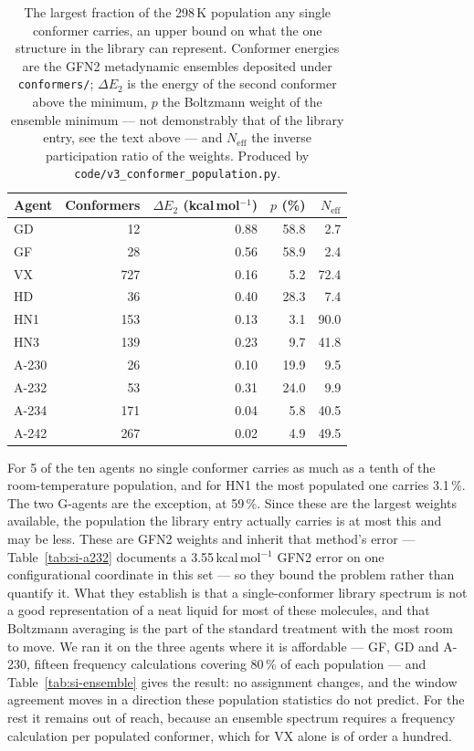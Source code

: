 \documentclass[11pt]{article}
\begin{document}
\begin{table}[htbp]
\centering
\caption{The largest fraction of the 298\,K population any single conformer carries, an
upper bound on what the one structure in the library can represent. Conformer energies are
the GFN2 metadynamic ensembles deposited under \texttt{conformers/}; $\Delta E_2$ is the
energy of the second conformer above the minimum, $p$ the Boltzmann weight of the ensemble
minimum --- not demonstrably that of the library entry, see the text above --- and
$N_\mathrm{eff}$ the inverse participation ratio of the weights. Produced by
\texttt{code/v3\_conformer\_population.py}.}
\label{tab:si-confpop}
\small
\begin{tabular}{lrrrr}
\toprule
Agent & Conformers & $\Delta E_2$ (kcal\,mol$^{-1}$) & $p$ (\%) & $N_\mathrm{eff}$ \\
\midrule
GD & 12 & 0.88 & 58.8 & 2.7 \\
GF & 28 & 0.56 & 58.9 & 2.4 \\
VX & 727 & 0.16 & 5.2 & 72.4 \\
HD & 36 & 0.40 & 28.3 & 7.4 \\
HN1 & 153 & 0.13 & 3.1 & 90.0 \\
HN3 & 139 & 0.23 & 9.7 & 41.8 \\
A-230 & 26 & 0.10 & 19.9 & 9.5 \\
A-232 & 53 & 0.31 & 24.0 & 9.9 \\
A-234 & 171 & 0.04 & 5.8 & 40.5 \\
A-242 & 267 & 0.02 & 4.9 & 49.5 \\
\bottomrule
\end{tabular}

\begin{flushleft}\footnotesize For 5 of the ten agents no single conformer carries as much
as a tenth of the room-temperature population, and for HN1 the most populated one carries
3.1\,\%. The two G-agents are the exception, at 59\,\%. Since these are the largest
weights available, the population the library entry actually carries is at most this and
may be less. These are GFN2 weights and inherit
that method's error --- Table~\ref{tab:si-a232} documents a 3.55\,kcal\,mol$^{-1}$ GFN2
error on one configurational coordinate in this set --- so they bound the problem rather
than quantify it. What they establish is that a single-conformer library spectrum is not a
good representation of a neat liquid for most of these molecules, and that Boltzmann
averaging is the part of the standard treatment with the most room to move. We ran it on
the three agents where it is affordable --- GF, GD and A-230, fifteen frequency
calculations covering 80\,\% of each population --- and Table~\ref{tab:si-ensemble} gives
the result: no assignment changes, and the window agreement moves in a direction these
population statistics do not predict. For the rest it remains out of reach, because an
ensemble spectrum requires a frequency calculation per populated conformer, which for VX
alone is of order a hundred.\end{flushleft}
\end{table}
\end{document}
